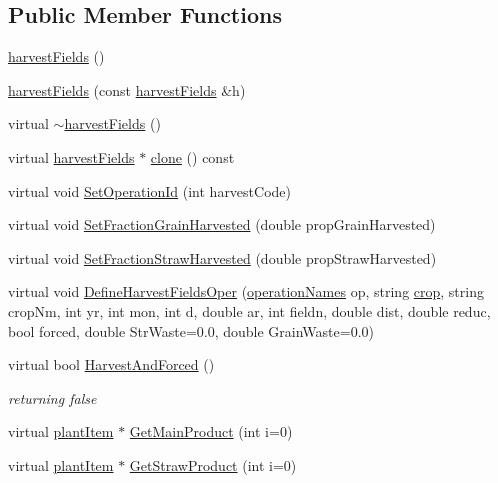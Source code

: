 \subsection*{Public Member Functions}
\begin{DoxyCompactItemize}
\item 
\hyperlink{classharvest_fields_a8b8fcdfd3c788f786028f5e0debd18cd}{harvestFields} ()
\item 
\hyperlink{classharvest_fields_a96f508aeaf0387012d820861a2c8add7}{harvestFields} (const \hyperlink{classharvest_fields}{harvestFields} \&h)
\item 
virtual \hyperlink{classharvest_fields_a55a3857a71addd3d362c0c9f85e6a920}{$\sim$harvestFields} ()
\item 
virtual \hyperlink{classharvest_fields}{harvestFields} $\ast$ \hyperlink{classharvest_fields_aa252f8782663a14d3ccefff889279b36}{clone} () const 
\item 
virtual void \hyperlink{classharvest_fields_abe2ee717c2495800b8ad75d9d7382b7b}{SetOperationId} (int harvestCode)
\item 
virtual void \hyperlink{classharvest_fields_abd4843e05dba100f27d5c1b4a4e0a004}{SetFractionGrainHarvested} (double propGrainHarvested)
\item 
virtual void \hyperlink{classharvest_fields_a0d164d1fd85c0c4545fa90d92f5c00ea}{SetFractionStrawHarvested} (double propStrawHarvested)
\item 
virtual void \hyperlink{classharvest_fields_aed7f89142c895481212938562ce61f3a}{DefineHarvestFieldsOper} (\hyperlink{operation_names_8h_a77d40de6faa131199a5de6df3d9c7e3d}{operationNames} op, string \hyperlink{classcrop}{crop}, string cropNm, int yr, int mon, int d, double ar, int fieldn, double dist, double reduc, bool forced, double StrWaste=0.0, double GrainWaste=0.0)
\item 
virtual bool \hyperlink{classharvest_fields_a3928ef45dc41fa069fcde4ff23f69d54}{HarvestAndForced} ()
\begin{DoxyCompactList}\small\item\em returning false \item\end{DoxyCompactList}\item 
virtual \hyperlink{classplant_item}{plantItem} $\ast$ \hyperlink{classharvest_fields_a20e16c680ffd74dbf3a06c3dfe94a85f}{GetMainProduct} (int i=0)
\item 
virtual \hyperlink{classplant_item}{plantItem} $\ast$ \hyperlink{classharvest_fields_ac4aae2b6cd458df8e64f859776e672ff}{GetStrawProduct} (int i=0)

\end{DoxyCompactItemize}
